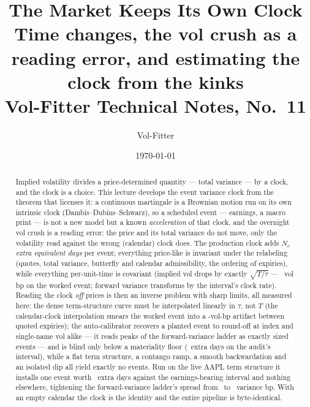 \documentclass[11pt]{article}
\title{\textbf{The Market Keeps Its Own Clock}\\[2pt]
\large Time changes, the vol crush as a reading error, and estimating
the clock from the kinks\\[2pt]
\normalsize Vol-Fitter Technical Notes, No.~11}
\author{Vol-Fitter}
\date{\today}
\begin{document}
\maketitle



\begin{abstract}
Implied volatility divides a price-determined quantity --- total variance
--- by a clock, and the clock is a choice.  This lecture develops the
event variance clock from the theorem that licenses it: a continuous
martingale is a Brownian motion run on its own intrinsic clock
(Dambis--Dubins--Schwarz), so a scheduled event --- earnings, a macro
print --- is not a new model but a known \emph{acceleration} of that
clock, and the overnight vol crush is a reading error: the price and its
total variance do not move, only the volatility read against the wrong
(calendar) clock does.  The production clock adds $N_e$ \emph{extra
equivalent days} per event; everything price-like is invariant under the
relabeling (quotes, total variance, butterfly and calendar admissibility,
the ordering of expiries), while everything per-unit-time is covariant
(implied vol drops by exactly $\sqrt{T/\tau}$ --- \emcdropbp\ vol bp on
the worked event; forward variance transforms by the interval's clock
rate).  Reading the clock \emph{off} prices is then an inverse problem
with sharp limits, all measured here: the dense term-structure curve must
be interpolated linearly in $\tau$, not $T$ (the calendar-clock
interpolation smears the worked event into a \emcinterpgapbp-vol-bp
artifact between quoted expiries); the auto-calibrator recovers a planted
event to round-off at index and single-name vol alike --- it reads
peaks of the forward-variance ladder as exactly sized events --- and is
blind only below a materiality floor (\emcidentfloor\ extra days on the
audit's interval), while a flat term structure, a contango ramp, a smooth
backwardation and an isolated dip all yield exactly no events.  Run on
the live AAPL term structure it installs one event worth \emcherodays\
extra days against the earnings-bearing interval and nothing elsewhere,
tightening the forward-variance ladder's spread from
\emcherospreadbefore\ to \emcherospreadafter\ variance bp.  With an empty
calendar the clock is the identity and the entire pipeline is
byte-identical.
\end{abstract}
\end{document}
